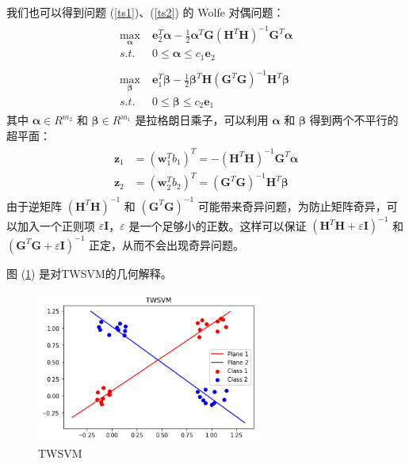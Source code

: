 我们也可以得到问题 (\ref{ts1})、(\ref{ts2}) 的 Wolfe 对偶问题：
\begin{align}
\begin{split}
\max\limits_{\pmb{\alpha}} \; & \mathbf{e}_2^T \pmb{\alpha}-\frac{1}{2}\pmb{\alpha}^T\mathbf{G}(\mathbf{H}^T\mathbf{H})^{-1}\mathbf{G}^T\pmb{\alpha} \\
s.t. \; & 0 \leq \pmb{\alpha}\leq c_1 \mathbf{e}_2
\end{split}
\\
\begin{split}
\max\limits_{\pmb{\beta}} \; & \mathbf{e}_1^T \pmb{\beta}-\frac{1}{2}\pmb{\beta}^T\mathbf{H}(\mathbf{G}^T\mathbf{G})^{-1}\mathbf{H}^T\pmb{\beta} \\
s.t. \; & 0 \leq \pmb{\beta} \leq c_2\mathbf{e}_1
\end{split}
\end{align}
其中 $\mathbf{\alpha} \in R^{m_2}$ 和 $\mathbf{\beta}\in R^{m_1}$ 是拉格朗日乘子，可以利用 $\mathbf{\alpha}$ 和 $\mathbf{\beta}$ 得到两个不平行的超平面：
\begin{align}
\begin{split}
\mathbf{z}_1 &= (\mathbf{w}^T_1b_1)^T = -(\mathbf{H}^T\mathbf{H})^{-1} \mathbf{G}^
T\pmb{\alpha} \\
\mathbf{z}_2 &= (\mathbf{w}^T_2b_2)^T = (\mathbf{G}^T\mathbf{G})^{-1} \mathbf{H}^T\pmb{\beta}
\end{split}
\end{align}
由于逆矩阵 $(\mathbf{H}^T\mathbf{H})^{-1}$ 和 $(\mathbf{G}^T\mathbf{G})^{-1}$ 可能带来奇异问题，为防止矩阵奇异，可以加入一个正则项 $\varepsilon \mathbf{I}$，$\varepsilon$ 是一个足够小的正数。这样可以保证 $(\mathbf{H}^T\mathbf{H}+\varepsilon \mathbf{I})^{-1}$ 和 $(\mathbf{G}^T\mathbf{G}+\varepsilon \mathbf{I})^{-1}$ 正定，从而不会出现奇异问题。

图 (\ref{twsvm1}) 是对TWSVM的几何解释。
\begin{figure}[ht]
	\centering
	\includegraphics[height=5cm]{./img/TWSVM-img.png}
	\caption{TWSVM}
	\label{twsvm1}
\end{figure}

